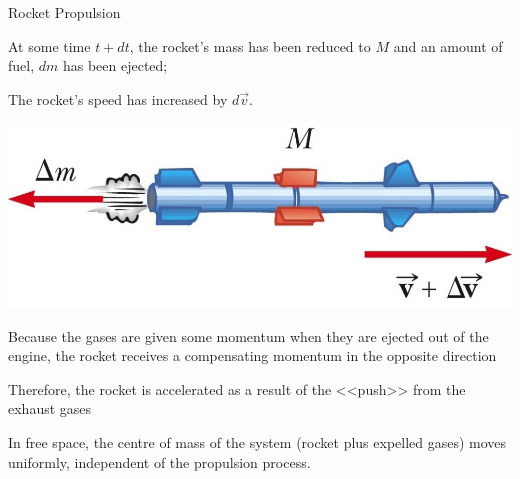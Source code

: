 \documentclass[18pt]{LectMechanics}
\begin{document}
\begin{frame}{Rocket Propulsion}{}
\begin{enumerate}
	\begin{minipage}{0.4\linewidth}
			\item At some time $t + d t$, the rocket’s mass has been reduced to $M$ and an amount of fuel, $d m$ has been ejected;
			\item The rocket’s speed has increased by $d \vec v$.
	\end{minipage}
	\begin{minipage}{0.5\linewidth}
		\includegraphics[width=\linewidth]{Rocket2}
	\end{minipage}
	\item Because the gases are given some momentum when they are ejected out of the engine, the rocket receives a compensating momentum in the opposite direction
	\item Therefore, the rocket is accelerated as a result of the <<push>> from the exhaust gases
	\item In free space, the centre of mass of the system (rocket plus expelled gases) moves uniformly, independent of 	the propulsion process.
\end{enumerate}
\end{frame}
\end{document}
